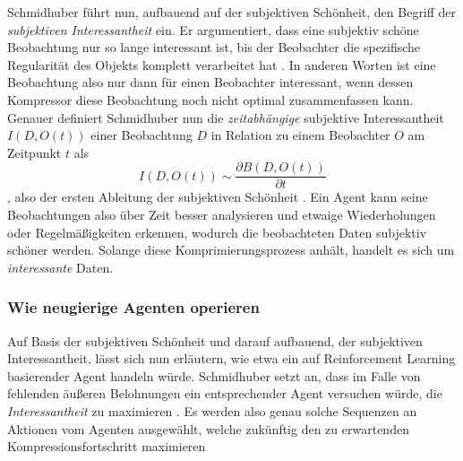 Schmidhuber führt nun, aufbauend auf der subjektiven Schönheit, den Begriff der \emph{subjektiven Interessantheit} ein. 
Er argumentiert, dass eine subjektiv schöne Beobachtung nur so lange interessant ist, bis der Beobachter die spezifische Regularität des Objekts komplett verarbeitet hat \cite[p.~7-8]{curiosity_schmidhuber}. In anderen Worten ist eine Beobachtung also nur dann für einen Beobachter interessant, wenn dessen Kompressor diese Beobachtung noch nicht optimal zusammenfassen kann. \\

Genauer definiert Schmidhuber nun die \emph{zeitabhängige} subjektive Interessantheit \(I(D,O(t))\) einer Beobachtung \(D\) in Relation zu einem Beobachter \(O\) am Zeitpunkt \(t\) als 
\begin{equation}
    I(D,O(t)) \sim \frac{\partial B(D,O(t))}{\partial t}
\end{equation}
, also der ersten Ableitung der subjektiven Schönheit \cite[p.~8]{curiosity_schmidhuber}.
Ein Agent kann seine Beobachtungen also über Zeit besser analysieren und etwaige Wiederholungen oder Regelmäßigkeiten erkennen, wodurch die beobachteten Daten subjektiv schöner werden. Solange diese Komprimierungsprozess anhält, handelt es sich um \emph{interessante} Daten. \cite[p.~8]{curiosity_schmidhuber}


\subsubsection{Wie neugierige Agenten operieren}
Auf Basis der subjektiven Schönheit und darauf aufbauend, der subjektiven Interessantheit, lässt sich nun erläutern, wie etwa ein auf Reinforcement Learning basierender Agent handeln würde. 
Schmidhuber setzt an, dass im Falle von fehlenden äußeren Belohnungen ein entsprechender Agent versuchen würde, die \emph{Interessantheit} zu maximieren \cite[p.~8]{curiosity_schmidhuber}.
Es werden also genau solche Sequenzen an Aktionen vom Agenten ausgewählt, welche zukünftig den zu erwartenden Kompressionsfortschritt maximieren \cite[p.~8]{curiosity_schmidhuber}


